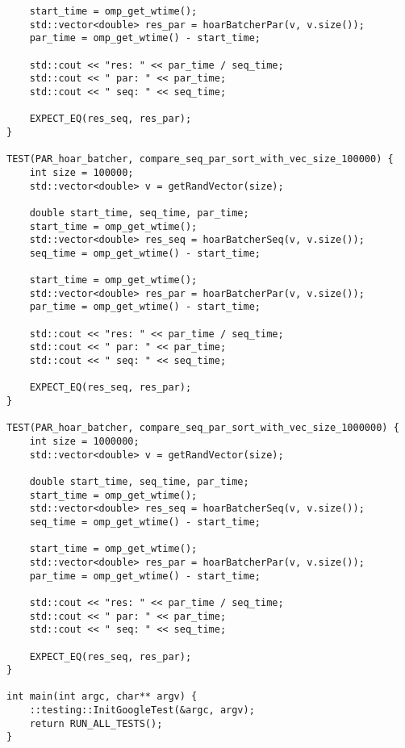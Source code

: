 \documentclass{report}
\begin{document}
\begin{lstlisting}
    start_time = omp_get_wtime();
    std::vector<double> res_par = hoarBatcherPar(v, v.size());
    par_time = omp_get_wtime() - start_time;

    std::cout << "res: " << par_time / seq_time;
    std::cout << " par: " << par_time;
    std::cout << " seq: " << seq_time;

    EXPECT_EQ(res_seq, res_par);
}

TEST(PAR_hoar_batcher, compare_seq_par_sort_with_vec_size_100000) {
    int size = 100000;
    std::vector<double> v = getRandVector(size);

    double start_time, seq_time, par_time;
    start_time = omp_get_wtime();
    std::vector<double> res_seq = hoarBatcherSeq(v, v.size());
    seq_time = omp_get_wtime() - start_time;

    start_time = omp_get_wtime();
    std::vector<double> res_par = hoarBatcherPar(v, v.size());
    par_time = omp_get_wtime() - start_time;

    std::cout << "res: " << par_time / seq_time;
    std::cout << " par: " << par_time;
    std::cout << " seq: " << seq_time;

    EXPECT_EQ(res_seq, res_par);
}

TEST(PAR_hoar_batcher, compare_seq_par_sort_with_vec_size_1000000) {
    int size = 1000000;
    std::vector<double> v = getRandVector(size);

    double start_time, seq_time, par_time;
    start_time = omp_get_wtime();
    std::vector<double> res_seq = hoarBatcherSeq(v, v.size());
    seq_time = omp_get_wtime() - start_time;

    start_time = omp_get_wtime();
    std::vector<double> res_par = hoarBatcherPar(v, v.size());
    par_time = omp_get_wtime() - start_time;

    std::cout << "res: " << par_time / seq_time;
    std::cout << " par: " << par_time;
    std::cout << " seq: " << seq_time;

    EXPECT_EQ(res_seq, res_par);
}

int main(int argc, char** argv) {
    ::testing::InitGoogleTest(&argc, argv);
    return RUN_ALL_TESTS();
}

\end{lstlisting}
\newpage
\end{document}
